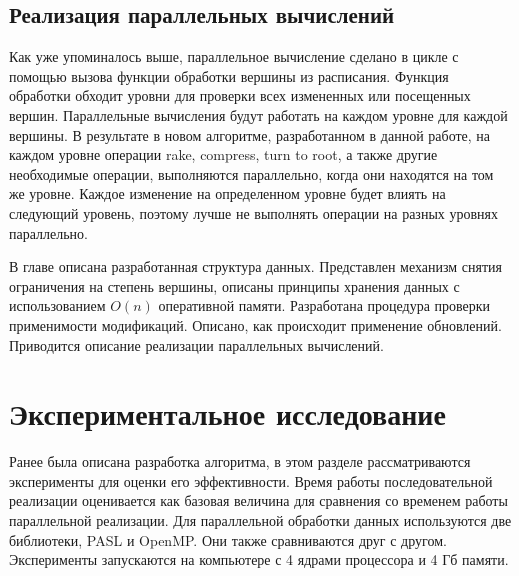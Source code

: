 \documentclass[specification,annotation]{itmo-student-thesis}
\begin{document}
\section{Реализация параллельных вычислений}

Как уже упоминалось выше, параллельное вычисление сделано в цикле с помощью вызова функции обработки вершины из расписания. Функция обработки обходит уровни для проверки всех измененных или посещенных вершин. 
Параллельные вычисления будут работать на каждом уровне для каждой вершины. В 
результате в новом алгоритме, разработанном в данной работе, на каждом уровне операции rake, compress, turn to root, а также другие необходимые операции, выполняются параллельно, 
когда они находятся на том же уровне. Каждое изменение на определенном уровне будет влиять на следующий уровень, поэтому лучше не выполнять операции на разных уровнях параллельно.


\chapterconclusion

В главе описана разработанная структура данных. Представлен механизм снятия ограничения на степень вершины, описаны принципы хранения данных с использованием $O(n)$ оперативной памяти. 
Разработана процедура проверки применимости модификаций. Описано, как происходит применение обновлений. Приводится описание реализации параллельных вычислений. 

\chapter{Экспериментальное исследование}

Ранее была описана разработка алгоритма, в этом разделе рассматриваются эксперименты для оценки его эффективности. Время работы последовательной реализации оценивается как базовая величина для сравнения со временем работы параллельной реализации. Для параллельной обработки данных используются две библиотеки, PASL и OpenMP. Они также сравниваются друг с другом. Эксперименты запускаются на компьютере с 4 ядрами процессора и 4 Гб памяти.
\end{document}
